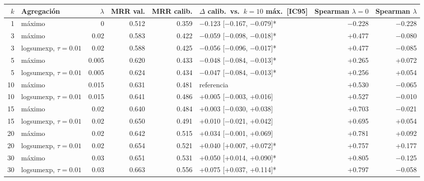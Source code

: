 \begin{tabular}{rlrrrlrr}
\toprule
$k$ & Agregación & $\lambda$ & MRR val. & MRR calib. & $\Delta$ calib.\ vs.\ $k=10$ máx.\ [IC95] & Spearman $\lambda=0$ & Spearman $\lambda$ \\
\midrule
1 & máximo & 0 & 0.512 & 0.359 & $-$0.123 [$-$0.167, $-$0.079]* & $-$0.228 & $-$0.228 \\
3 & máximo & 0.02 & 0.583 & 0.422 & $-$0.059 [$-$0.098, $-$0.018]* & +0.477 & $-$0.080 \\
3 & logsumexp, $\tau=0.01$ & 0.02 & 0.588 & 0.425 & $-$0.056 [$-$0.096, $-$0.017]* & +0.477 & $-$0.085 \\
5 & máximo & 0.005 & 0.620 & 0.433 & $-$0.048 [$-$0.084, $-$0.013]* & +0.265 & +0.072 \\
5 & logsumexp, $\tau=0.01$ & 0.005 & 0.624 & 0.434 & $-$0.047 [$-$0.084, $-$0.013]* & +0.256 & +0.054 \\
10 & máximo & 0.015 & 0.631 & 0.481 & referencia & +0.530 & $-$0.065 \\
10 & logsumexp, $\tau=0.01$ & 0.015 & 0.641 & 0.486 & +0.005 [$-$0.003, +0.016] & +0.527 & $-$0.010 \\
15 & máximo & 0.02 & 0.640 & 0.484 & +0.003 [$-$0.030, +0.038] & +0.703 & $-$0.021 \\
15 & logsumexp, $\tau=0.01$ & 0.02 & 0.650 & 0.491 & +0.010 [$-$0.021, +0.042] & +0.695 & +0.054 \\
20 & máximo & 0.02 & 0.642 & 0.515 & +0.034 [$-$0.001, +0.069] & +0.781 & +0.092 \\
20 & logsumexp, $\tau=0.01$ & 0.02 & 0.654 & 0.521 & +0.040 [+0.007, +0.072]* & +0.757 & +0.177 \\
30 & máximo & 0.03 & 0.651 & 0.531 & +0.050 [+0.014, +0.090]* & +0.805 & $-$0.125 \\
30 & logsumexp, $\tau=0.01$ & 0.03 & 0.663 & 0.556 & +0.075 [+0.037, +0.114]* & +0.797 & $-$0.058 \\
\bottomrule
\end{tabular}

